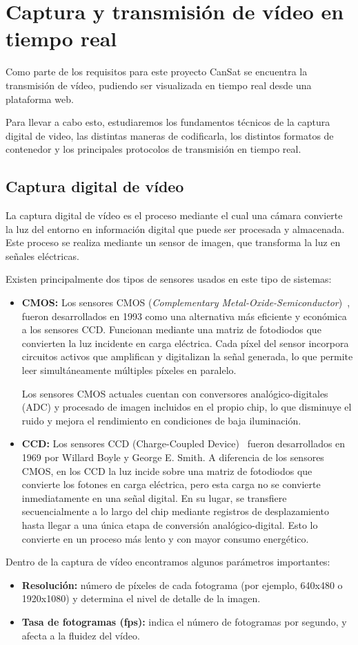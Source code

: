 \section{Captura y transmisión de vídeo en tiempo real}
Como parte de los requisitos para este proyecto CanSat se encuentra la transmisión de vídeo, pudiendo ser visualizada en tiempo real desde una plataforma web.

Para llevar a cabo esto, estudiaremos los fundamentos técnicos de la captura digital de video, las distintas maneras de codificarla, los distintos formatos de contenedor y los principales protocolos de transmisión en tiempo real.

\subsection{Captura digital de vídeo}
La captura digital de vídeo es el proceso mediante el cual una cámara convierte la luz del entorno en información digital que puede ser procesada y almacenada.
Este proceso se realiza mediante un sensor de imagen, que transforma la luz en señales eléctricas.

Existen principalmente dos tipos de sensores usados en este tipo de sistemas:
\begin{itemize}
    \item \textbf{CMOS:} Los sensores CMOS (\emph{Complementary Metal-Oxide-Semiconductor})~\citep{cmos}, fueron desarrollados en 1993 como una alternativa más eficiente y económica a los sensores CCD.
    Funcionan mediante una matriz de fotodiodos que convierten la luz incidente en carga eléctrica.
    Cada píxel del sensor incorpora circuitos activos que amplifican y digitalizan la señal generada, lo que permite leer simultáneamente múltiples píxeles en paralelo.

    Los sensores CMOS actuales cuentan con conversores analógico-digitales (ADC) y procesado de imagen incluidos en el propio chip, lo que disminuye el ruido y mejora el rendimiento en condiciones de baja iluminación.
    \item \textbf{CCD:} Los sensores CCD (Charge-Coupled Device)~\citep{blanc2001ccd} fueron desarrollados en 1969 por Willard Boyle y George E. Smith.
    A diferencia de los sensores CMOS, en los CCD la luz incide sobre una matriz de fotodiodos que convierte los fotones en carga eléctrica, pero esta carga no se convierte inmediatamente en una señal digital.
    En su lugar, se transfiere secuencialmente a lo largo del chip mediante registros de desplazamiento hasta llegar a una única etapa de conversión analógico-digital.
%
    Esto lo convierte en un proceso más lento y con mayor consumo energético.
\end{itemize}
Dentro de la captura de vídeo encontramos algunos parámetros importantes:
\begin{itemize}
    \item \textbf{Resolución:} número de píxeles de cada fotograma (por ejemplo, 640x480 o 1920x1080) y determina el nivel de detalle de la imagen.
    \item \textbf{Tasa de fotogramas (fps):} indica el número de fotogramas por segundo, y afecta a la fluidez del vídeo.
\end{itemize}

